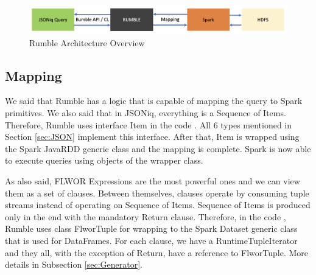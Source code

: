 \begin{figure}[h!]
	\vspace*{-5mm}
	\includegraphics[width=\linewidth]{rumble_architecture.png}
	\caption{Rumble Architecture Overview}
	\label{fig:Rumble_Architecture}
\end{figure}

\subsection{Mapping}
\label{sec:RumbleMapping}
We said that Rumble has a logic that is capable of mapping the query to Spark primitives. We also said that in JSONiq, everything is a Sequence of Items. Therefore, Rumble uses interface Item in the code \cite{RumbleRepository}. All 6 types mentioned in Section \ref{sec:JSON} implement this interface. After that, Item is wrapped using the Spark JavaRDD generic class and the mapping is complete. Spark is now able to execute queries using objects of the wrapper class.

As also said, FLWOR Expressions are the most powerful ones and we can view them as a set of clauses. Between themselves, clauses operate by consuming tuple streams instead of operating on Sequence of Items. Sequence of Items is produced only in the end with the mandatory Return clause. Therefore, in the code \cite{RumbleRepository}, Rumble uses class FlworTuple for wrapping to the Spark Dataset generic class that is used for DataFrames. For each clause, we have a RuntimeTupleIterator and they all, with the exception of Return, have a reference to FlworTuple. More details in Subsection \ref{sec:Generator}.

